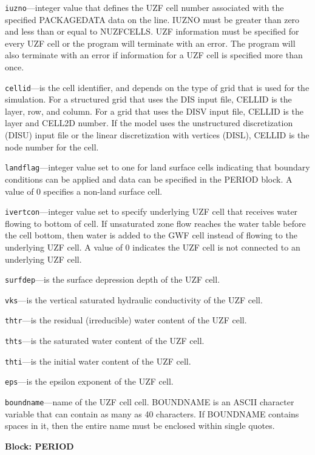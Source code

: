 \begin{description}
\item \texttt{iuzno}---integer value that defines the UZF cell number associated with the specified PACKAGEDATA data on the line. IUZNO must be greater than zero and less than or equal to NUZFCELLS.  UZF information must be specified for every UZF cell or the program will terminate with an error.  The program will also terminate with an error if information for a UZF cell is specified more than once.

\item \texttt{cellid}---is the cell identifier, and depends on the type of grid that is used for the simulation.  For a structured grid that uses the DIS input file, CELLID is the layer, row, and column.   For a grid that uses the DISV input file, CELLID is the layer and CELL2D number.  If the model uses the unstructured discretization (DISU) input file or the linear discretization with vertices (DISL), CELLID is the node number for the cell.

\item \texttt{landflag}---integer value set to one for land surface cells indicating that boundary conditions can be applied and data can be specified in the PERIOD block. A value of 0 specifies a non-land surface cell.

\item \texttt{ivertcon}---integer value set to specify underlying UZF cell that receives water flowing to bottom of cell. If unsaturated zone flow reaches the water table before the cell bottom, then water is added to the GWF cell instead of flowing to the underlying UZF cell. A value of 0 indicates the UZF cell is not connected to an underlying UZF cell.

\item \texttt{surfdep}---is the surface depression depth of the UZF cell.

\item \texttt{vks}---is the vertical saturated hydraulic conductivity of the UZF cell.

\item \texttt{thtr}---is the residual (irreducible) water content of the UZF cell.

\item \texttt{thts}---is the saturated water content of the UZF cell.

\item \texttt{thti}---is the initial water content of the UZF cell.

\item \texttt{eps}---is the epsilon exponent of the UZF cell.

\item \texttt{boundname}---name of the UZF cell cell.  BOUNDNAME is an ASCII character variable that can contain as many as 40 characters.  If BOUNDNAME contains spaces in it, then the entire name must be enclosed within single quotes.

\end{description}
\item \textbf{Block: PERIOD}

